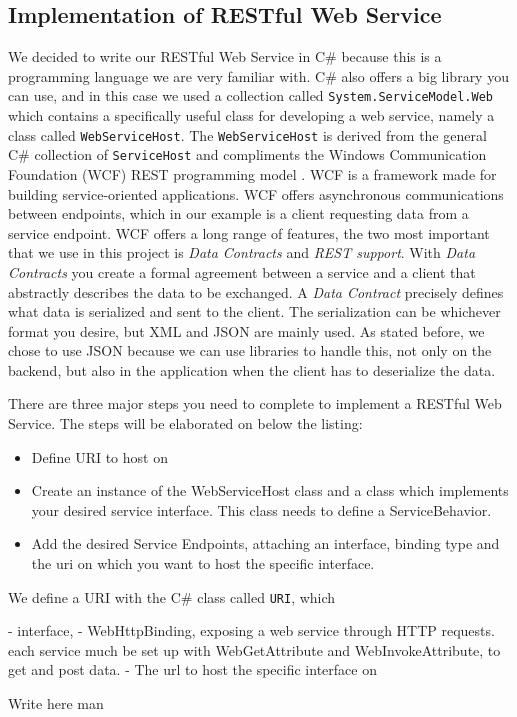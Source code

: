 \subsection{Implementation of RESTful Web Service}
\label{subsec:restImpl}

We decided to write our RESTful Web Service in C\# because this is a programming language we are very familiar with. C\# also offers a big library you can use, and in this case we used a collection called \texttt{System.ServiceModel.Web} which contains a specifically useful class for developing a web service, namely a class called \texttt{WebServiceHost}. The \texttt{WebServiceHost} is derived from the general C\# collection of \texttt{ServiceHost} and compliments the Windows Communication Foundation (WCF) REST programming model .
WCF is a framework made for building service-oriented applications. WCF offers asynchronous communications between endpoints, which in our example is a client requesting data from a service endpoint. WCF offers a long range of features, the two most important that we use in this project is \textit{Data Contracts} and \textit{REST support}. 
With \textit{Data Contracts} you create a formal agreement between a service and a client that abstractly describes the data to be exchanged. A \textit{Data Contract} precisely defines what data is serialized and sent to the client. The serialization can be whichever format you desire, but XML and JSON are mainly used. As stated before, we chose to use JSON because we can use libraries to handle this, not only on the backend, but also in the application when the client has to deserialize the data.

There are three major steps you need to complete to implement a RESTful Web Service. The steps will be elaborated on below the listing:
\begin{itemize}
\item Define URI to host on
\item Create an instance of the WebServiceHost class and a class which implements your desired service interface. This class needs to define a ServiceBehavior.
\item Add the desired Service Endpoints, attaching an interface, binding type and the uri on which you want to host the specific interface.
\end{itemize}

We define a URI with the C\# class called \texttt{URI}, which 

- interface, 
- WebHttpBinding, exposing a web service through HTTP requests. each service much be set up with WebGetAttribute and WebInvokeAttribute, to get and post data.
- The url to host the specific interface on

Write here man
